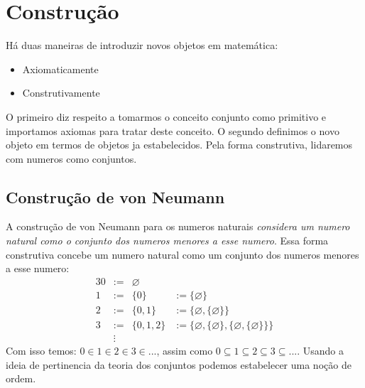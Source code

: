 \section{Construção}
   Há duas maneiras de introduzir novos objetos em matemática:
   \begin{itemize}
      \item Axiomaticamente
      \item Construtivamente
   \end{itemize}
   O primeiro diz respeito a tomarmos o conceito conjunto como primitivo e importamos axiomas 
   para tratar deste conceito. O segundo definimos o novo objeto em termos de objetos ja 
   estabelecidos. Pela forma construtiva, lidaremos com numeros como conjuntos.
   \subsection{Construção de von Neumann}
      A construção de von Neumann para os numeros naturais 
      \emph{considera um numero natural como o conjunto dos numeros 
      menores a esse numero}.
      Essa forma construtiva concebe um numero natural como um conjunto dos numeros 
      menores a esse numero:
      \begin{alignat}{3}
         \nonumber 0 &:=& \varnothing\\
         \nonumber 1 &:=& \{0\} &:= \{\varnothing\}\\
         \nonumber 2 &:=& \{0,1\}& := \{\varnothing, \{\varnothing\}\}\\
         \nonumber 3 &:=& \{0,1,2\} &:= 
         \{\varnothing, \{\varnothing\}, \{\varnothing, \{\varnothing\}\}\}\\
         \nonumber &\vdots
      \end{alignat}
      Com isso temos: $0 \in 1 \in 2 \in 3 \in ...$, assim 
      como $ 0 \subseteq 1 \subseteq 2 \subseteq 3 \subseteq ...$. 
      Usando a ideia de pertinencia da teoria dos conjuntos podemos estabelecer uma noção de ordem.
